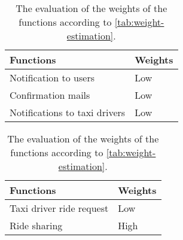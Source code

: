 \begin{table}[h]
\begin{subtable}{\textwidth}
    \centering
    \begin{tabular}{| l | l |}
        \hline
        \textbf{Functions} & \textbf{Weights} \\
        \hline
        Notification to users & Low\\
        Confirmation mails & Low\\
        Notifications to taxi drivers & Low\\
        \hline
    \end{tabular}
    \caption{Computed weights for EOs}
\end{subtable}

\vspace{2em}

\begin{subtable}{\textwidth}
    \centering
    \begin{tabular}{| l | l |}
        \hline
        \textbf{Functions} & \textbf{Weights} \\
        \hline
        Taxi driver ride request & Low\\
        Ride sharing & High\\
        \hline
    \end{tabular}
    \caption{Computed weights for EQs}
\end{subtable}
\caption{The evaluation of the weights of the functions according to \autoref{tab:weight-estimation}.}
\label{tab:computed-weights}
\end{table}
